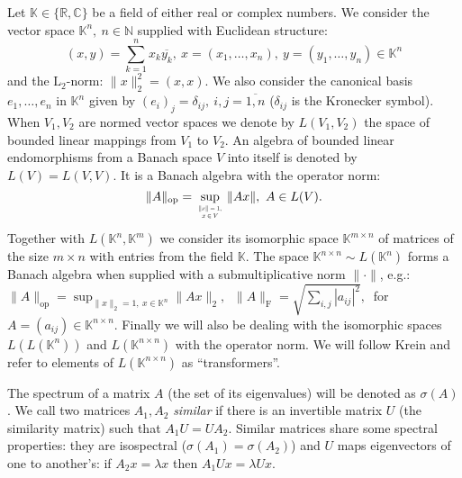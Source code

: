 \documentclass[a4paper]{jpconf}
\begin{document}
Let \( \mathbb{K}\in \{ \mathbb{R}, \mathbb{C} \} \)
    be a field of either real or complex numbers.
We consider the vector space \( \mathbb{K}^n,\ n\in \mathbb{N} \)
    supplied with Euclidean structure:
    \[
        (x, y){=}\sum_{k=1}^n x_k\overline{y_k},
        \ x{=}(x_1,\ldots, x_n),
        \ y=(y_1,\ldots, y_n)
        \in \mathbb{K}^n
        \]
    and the \( \mathrm{L}_2 \)-norm:
    \(
        \|x\|_2^2{=}(x,x).
        \)
We also consider the canonical basis \( e_1, \ldots, e_n \)
    in \( \mathbb{K}^n \) given by
    \( {(e_i)}_j = \delta_{ij},\ i,j=\overline{1,n} \)
    (\(\delta_{ij} \) is the Kronecker symbol).
When \( V_1, V_2 \) are normed vector spaces
    we denote by \( L(V_1, V_2) \)
    the space of bounded linear mappings
    from \( V_1 \) to \( V_2 \).
An algebra of bounded linear endomorphisms
    from a Banach space \( V \)
    into itself
    is denoted by \( L(V) = L(V, V) \).
It is a Banach algebra with the operator norm:
    \[
        \|A\|_{\mathrm{op}} =
        \sup_{\scalebox{.5}{\(
            \begin{array}{c}
                \|x\|=1,\cr x\in V
            \end{array}
        \)}
        } \|A x\|,\ A\in L(V).
        \]
Together with \( L(\mathbb{K}^n, \mathbb{K}^m) \)
    we consider its isomorphic space \( \mathbb{K}^{m{\times}n} \)
    of matrices of the size \( m{\times}n \)
    with entries from the field \( \mathbb{K} \).
The space \( \mathbb{K}^{n{\times}n}\sim L(\mathbb{K}^n) \)
    forms a Banach algebra
    when supplied with a submultiplicative norm
    \( \|\cdot\| \),
    e.g.: \( \|A\|_{\mathrm{op}} = \sup_{\|x\|_2=1,\ x\in \mathbb{K}^n} \|A x\|_2,\ \)
    \( \|A\|_{\mathrm{F}} = \sqrt{\sum_{i,j} |a_{ij}|^2},\ \)
    for 
    \( A{=}(a_{ij})\in\mathbb{K}^{n\times n} \).
Finally we will also be dealing with the isomorphic spaces
    \( L(L(\mathbb{K}^n)) \) and \( L(\mathbb{K}^{n{\times}n}) \)
    with the operator norm.
We will follow Krein
    and refer to elements of \( L(\mathbb{K}^{n{\times}n}) \)
    as ``transformers''.

The spectrum of a matrix \( A \)
    (the set of its eigenvalues)
    will be denoted as \( \sigma(A) \).
We call two matrices \( A_1, A_2 \) \emph{similar}
    if there is an invertible matrix \( U \)
    (the similarity matrix)
    such that \( A_1 U = U A_2 \).
Similar matrices share some spectral properties:
    they are isospectral (\( \sigma(A_1) = \sigma(A_2) \))
    and \( U \) maps eigenvectors of one to another's:
    if \( A_2 x = \lambda x \) then \( A_1 U x = \lambda U x \).
\end{document}

